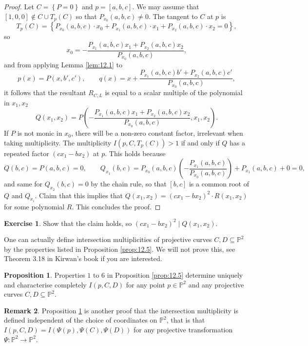 \documentclass{article}
\renewcommand{\P}{\mathbb{P}}
\newcommand{\rb}[1]{\left( #1 \right)}
\renewcommand{\sb}[1]{\left[ #1 \right]}
\newcommand{\cb}[1]{\left\{ #1 \right\}}
\theoremstyle{definition}\newtheorem{definition}{Definition}[section]
\theoremstyle{definition}\newtheorem{notation}[definition]{Notation}
\theoremstyle{definition}\newtheorem{remark}[definition]{Remark}
\theoremstyle{definition}\newtheorem{example}[definition]{Example}
\theoremstyle{definition}\newtheorem{fact}{Fact}
\theoremstyle{definition}\newtheorem{exercise}{Exercise}
\newtheorem{proposition}[definition]{Proposition}
\begin{document}
\begin{proof}
Let $ C = \cb{P = 0} $ and $ p = \sb{a, b, c} $. We may assume that $ \sb{1, 0, 0} \notin C \cup T_p\rb{C} $ so that $ P_{x_0}\rb{a, b, c} \ne 0 $. The tangent to $ C $ at $ p $ is
$$ T_p\rb{C} = \cb{P_{x_0}\rb{a, b, c} \cdot x_0 + P_{x_1}\rb{a, b, c} \cdot x_1 + P_{x_2}\rb{a, b, c} \cdot x_2 = 0}, $$
so
$$ x_0 = -\dfrac{P_{x_1}\rb{a, b, c}x_1 + P_{x_2}\rb{a, b, c}x_2}{P_{x_0}\rb{a, b, c}}, $$
and from applying Lemma \ref{lem:12.1} to
$$ p\rb{x} = P\rb{x, b', c'}, \qquad q\rb{x} = x + \dfrac{P_{x_1}\rb{a, b, c}b' + P_{x_2}\rb{a, b, c}c'}{P_{x_0}\rb{a, b, c}}, $$
it follows that the resultant $ R_{C, L} $ is equal to a scalar multiple of the polynomial in $ x_1, x_2 $
$$ Q\rb{x_1, x_2} = P\rb{-\dfrac{P_{x_1}\rb{a, b, c}x_1 + P_{x_2}\rb{a, b, c}x_2}{P_{x_0}\rb{a, b, c}}, x_1, x_2}. $$
If $ P $ is not monic in $ x_0 $, there will be a non-zero constant factor, irrelevant when taking multiplicity. The multiplicity $ I\rb{p, C, T_p\rb{C}} > 1 $ if and only if $ Q $ has a repeated factor $ \rb{cx_1 - bx_2} $ at $ p $. This holds because
$$ Q\rb{b, c} = P\rb{a, b, c} = 0, \qquad Q_{x_1}\rb{b, c} = P_{x_0}\rb{a, b, c}\rb{-\dfrac{P_{x_1}\rb{a, b, c}}{P_{x_0}\rb{a, b, c}}} + P_{x_1}\rb{a, b, c} + 0 = 0, $$
and same for $ Q_{x_2}\rb{b, c} = 0 $ by the chain rule, so that $ \sb{b, c} $ is a common root of $ Q $ and $ Q_{x_i} $. Claim that this implies that $ Q\rb{x_1, x_2} = \rb{cx_1 - bx_2}^2 \cdot R\rb{x_1, x_2} $ for some polynomial $ R $. This concludes the proof.
\end{proof}

\begin{exercise}
Show that the claim holds, so $ \rb{cx_1 - bx_2}^2 \mid Q\rb{x_1, x_2} $.
\end{exercise}

One can actually define intersection multiplicities of projective curves $ C, D \subseteq \P^2 $ by the properties listed in Proposition \ref{prop:12.5}. We will not prove this, see Theorem 3.18 in Kirwan's book if you are interested.

\begin{proposition}
\label{prop:12.8}
Properties $ 1 $ to $ 6 $ in Proposition \ref{prop:12.5} determine uniquely and characterise completely $ I\rb{p, C, D} $ for any point $ p \in \P^2 $ and any projective curves $ C, D \subseteq \P^2 $.
\end{proposition}

\begin{remark}
Proposition \ref{prop:12.8} is another proof that the intersection multiplicity is defined independent of the choice of coordinates on $ \P^2 $, that is that $ I\rb{p, C, D} = I\rb{\Psi\rb{p}, \Psi\rb{C}, \Psi\rb{D}} $ for any projective transformation $ \Psi : \P^2 \to \P^2 $.
\end{remark}
\end{document}
